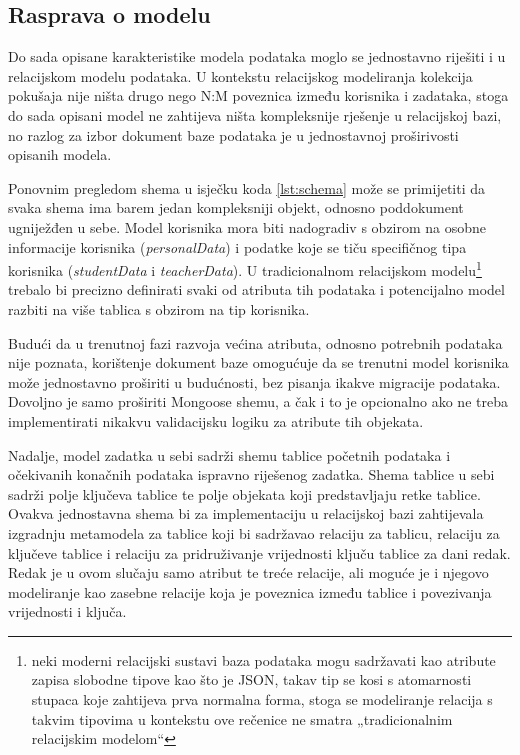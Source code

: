 \documentclass[times, utf8, diplomski, numeric]{fer}
\newcommand{\razmakp}{\vspace{18pt}}
\newcommand{\razmaks}{\vspace{10pt}}
\begin{document}
\razmaks
\subsection{Rasprava o modelu}

Do sada opisane karakteristike modela podataka moglo se jednostavno riješiti i u relacijskom modelu podataka.
U kontekstu relacijskog modeliranja kolekcija pokušaja nije ništa drugo nego N:M poveznica između korisnika i zadataka, stoga do sada opisani model ne zahtijeva ništa kompleksnije rješenje u relacijskoj bazi, no razlog za izbor dokument baze podataka je u jednostavnoj proširivosti opisanih modela.

\razmakp

Ponovnim pregledom shema u isječku koda \ref{lst:schema} može se primijetiti da svaka shema ima barem jedan kompleksniji objekt, odnosno poddokument ugniježđen u sebe.
Model korisnika mora biti nadogradiv s obzirom na osobne informacije korisnika (\emph{personalData}) i podatke koje se tiču specifičnog tipa korisnika (\emph{studentData} i \emph{teacherData}).
U tradicionalnom relacijskom modelu\footnote{
    neki moderni relacijski sustavi baza podataka mogu sadržavati kao atribute zapisa slobodne tipove kao što je JSON, takav tip se kosi s atomarnosti stupaca koje zahtijeva prva normalna forma, stoga se modeliranje relacija s takvim tipovima u kontekstu ove rečenice ne smatra „tradicionalnim relacijskim modelom“
} trebalo bi precizno definirati svaki od atributa tih podataka i potencijalno model razbiti na više tablica s obzirom na tip korisnika.

Budući da u trenutnoj fazi razvoja većina atributa, odnosno potrebnih podataka nije poznata, korištenje dokument baze omogućuje da se trenutni model korisnika može jednostavno proširiti u budućnosti, bez pisanja ikakve migracije podataka.
Dovoljno je samo proširiti Mongoose shemu, a čak i to je opcionalno ako ne treba implementirati nikakvu validacijsku logiku za atribute tih objekata.

\razmakp

Nadalje, model zadatka u sebi sadrži shemu tablice početnih podataka i očekivanih konačnih podataka ispravno riješenog zadatka.
Shema tablice u sebi sadrži polje ključeva tablice te polje objekata koji predstavljaju retke tablice.
Ovakva jednostavna shema bi za implementaciju u relacijskoj bazi zahtijevala izgradnju metamodela za tablice koji bi sadržavao relaciju za tablicu, relaciju za ključeve tablice i relaciju za pridruživanje vrijednosti ključu tablice za dani redak.
Redak je u ovom slučaju samo atribut te treće relacije, ali moguće je i njegovo modeliranje kao zasebne relacije koja je poveznica između tablice i povezivanja vrijednosti i ključa.
\end{document}
